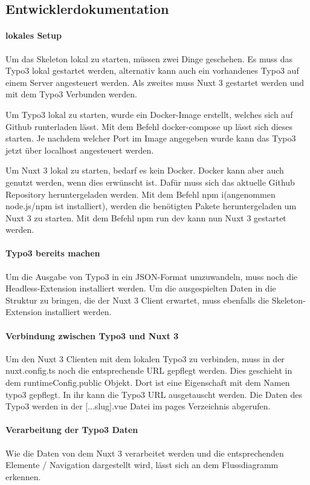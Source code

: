 \subsection{Entwicklerdokumentation}
\label{app:Doc}

\paragraph{lokales Setup}

Um das Skeleton lokal zu starten, müssen zwei Dinge geschehen. Es muss das Typo3 lokal gestartet werden, alternativ kann auch ein vorhandenes Typo3 auf einem Server angesteuert werden. Als zweites muss Nuxt 3 gestartet werden und mit dem Typo3 Verbunden werden. 

Um Typo3 lokal zu starten, wurde ein Docker-Image erstellt, welches sich auf Github runterladen lässt. Mit dem Befehl docker-compose up lässt sich dieses starten. Je nachdem welcher Port im Image angegeben wurde kann das Typo3 jetzt über localhost angesteuert werden.

Um Nuxt 3 lokal zu starten, bedarf es kein Docker. Docker kann aber auch genutzt werden, wenn dies erwünscht ist. Dafür muss sich das aktuelle Github Repository heruntergeladen werden. Mit dem Befehl npm i(angenommen node.js/npm ist installiert), werden die benötigten Pakete heruntergeladen um Nuxt 3 zu starten. Mit dem Befehl npm run dev kann nun Nuxt 3 gestartet werden.

\paragraph{Typo3 bereits machen}

Um die Ausgabe von Typo3 in ein JSON-Format umzuwandeln, muss noch die Headless-Extension installiert werden. Um die ausgespielten Daten in die Struktur zu bringen, die der Nuxt 3 Client erwartet, muss ebenfalls die Skeleton-Extension installiert werden.

\paragraph{Verbindung zwischen Typo3 und Nuxt 3}

Um den Nuxt 3 Clienten mit dem lokalen Typo3 zu verbinden, muss in der nuxt.config.ts noch die entsprechende URL gepflegt werden. Dies geschieht in dem runtimeConfig.public Objekt. Dort ist eine Eigenschaft mit dem Namen typo3 gepflegt. In ihr kann die Typo3 URL ausgetauscht werden. Die Daten des Typo3 werden in der [...slug].vue Datei im pages Verzeichnis abgerufen.

\paragraph{Verarbeitung der Typo3 Daten}

Wie die Daten von dem Nuxt 3 verarbeitet werden und die entsprechenden Elemente / Navigation dargestellt wird, lässt sich an dem Flussdiagramm erkennen.

